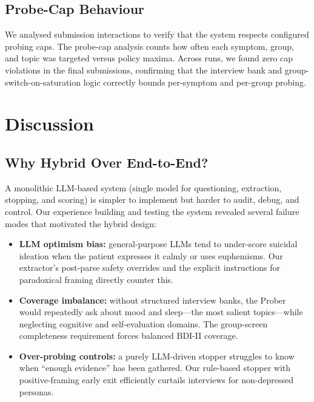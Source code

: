 \documentclass[]{ceurart}
\begin{document}
\subsection{Probe-Cap Behaviour}\label{sec:probecaps}

We analysed submission interactions to verify that the system respects configured probing caps.
The probe-cap analysis counts how often each symptom, group, and topic was targeted versus policy maxima.
Across runs, we found zero cap violations in the final submissions, confirming that the interview bank and group-switch-on-saturation logic correctly bounds per-symptom and per-group probing.


\section{Discussion}\label{sec:discussion}

\subsection{Why Hybrid Over End-to-End?}

A monolithic LLM-based system (single model for questioning, extraction, stopping, and scoring) is simpler to implement but harder to audit, debug, and control.
Our experience building and testing the system revealed several failure modes that motivated the hybrid design:

\begin{itemize}
\item \textbf{LLM optimism bias:} general-purpose LLMs tend to under-score suicidal ideation when the patient expresses it calmly or uses euphemisms.
Our extractor's post-parse safety overrides and the explicit instructions for paradoxical framing directly counter this.
\item \textbf{Coverage imbalance:} without structured interview banks, the Prober would repeatedly ask about mood and sleep---the most salient topics---while neglecting cognitive and self-evaluation domains.
The group-screen completeness requirement forces balanced BDI-II coverage.
\item \textbf{Over-probing controls:} a purely LLM-driven stopper struggles to know when ``enough evidence'' has been gathered.
Our rule-based stopper with positive-framing early exit efficiently curtails interviews for non-depressed personas.
\end{itemize}
\end{document}
